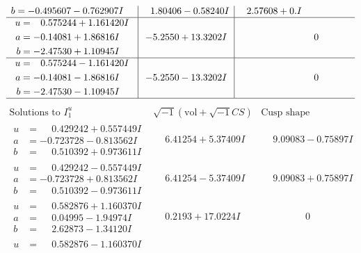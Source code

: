 \documentclass[1p]{elsarticle_modified}
\theoremstyle{definition}
\newcommand{\I}{\sqrt{-1}}
\begin{document}
$$\begin{array}{c|c|c}
\begin{aligned}
b &= -0.495607 - 0.762907 I\end{aligned}
 & \phantom{-}1.80406 - 0.58240 I & \phantom{-}2.57608 + 0. I\phantom{ +0.000000I} \\ \hline\begin{aligned}
u &= \phantom{-}0.575244 + 1.161420 I \\
a &= -0.14081 + 1.86816 I \\
b &= -2.47530 + 1.10945 I\end{aligned}
 & -5.2550 + 13.3202 I & \phantom{-0.000000 } 0 \\ \hline\begin{aligned}
u &= \phantom{-}0.575244 - 1.161420 I \\
a &= -0.14081 - 1.86816 I \\
b &= -2.47530 - 1.10945 I\end{aligned}
 & -5.2550 - 13.3202 I & \phantom{-0.000000 } 0\\
 \hline 
 \end{array}$$\newpage$$\begin{array}{c|c|c}  
\text{Solutions to }I^u_{1}& \I (\text{vol} + \sqrt{-1}CS) & \text{Cusp shape}\\
 \hline 
\begin{aligned}
u &= \phantom{-}0.429242 + 0.557449 I \\
a &= -0.723728 - 0.813562 I \\
b &= \phantom{-}0.510392 + 0.973611 I\end{aligned}
 & \phantom{-}6.41254 + 5.37409 I & \phantom{-}9.09083 - 0.75897 I \\ \hline\begin{aligned}
u &= \phantom{-}0.429242 - 0.557449 I \\
a &= -0.723728 + 0.813562 I \\
b &= \phantom{-}0.510392 - 0.973611 I\end{aligned}
 & \phantom{-}6.41254 - 5.37409 I & \phantom{-}9.09083 + 0.75897 I \\ \hline\begin{aligned}
u &= \phantom{-}0.582876 + 1.160370 I \\
a &= \phantom{-}0.04995 - 1.94974 I \\
b &= \phantom{-}2.62873 - 1.34120 I\end{aligned}
 & \phantom{-}0.2193 + 17.0224 I & \phantom{-0.000000 } 0 \\ \hline\begin{aligned}
u &= \phantom{-}0.582876 - 1.160370 I \\

\end{aligned}
\end{array}$$
\end{document}
